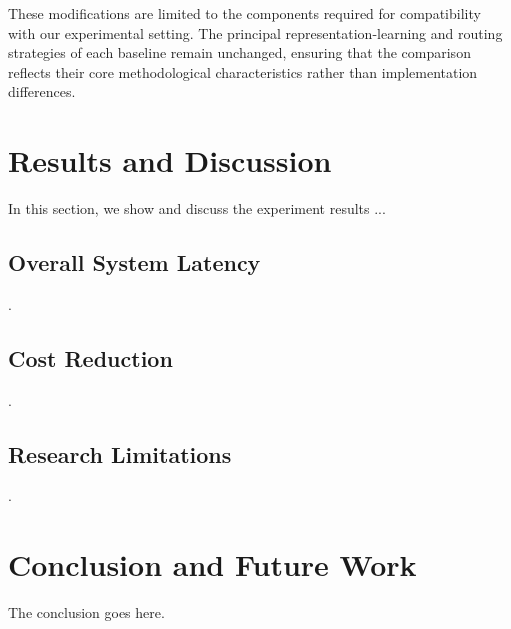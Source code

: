 \documentclass[lettersize,journal]{IEEEtran}
\begin{document}
These modifications are limited to the components required for compatibility with our experimental setting. The principal representation-learning and routing strategies of each baseline remain unchanged, ensuring that the comparison reflects their core methodological characteristics rather than implementation differences.

\section{Results and Discussion}
\label{sec:results}
In this section, we show and discuss the experiment results ...

\subsection{Overall System Latency}
.

\subsection{Cost Reduction}
.

\subsection{Research Limitations}
.

\section{Conclusion and Future Work}
\label{sec:conclusion}
The conclusion goes here.
\end{document}
